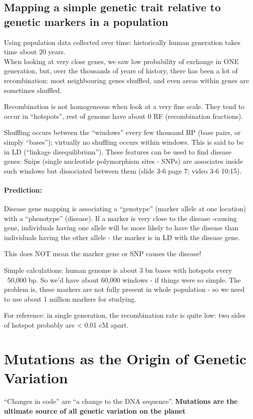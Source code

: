 \documentclass{scrartcl}
\begin{document}
\subsection{Mapping a simple genetic trait relative to genetic markers in a
  population}
\label{sec:3-6}
Using population data collected over time: historically human generation takes
time about 20 years. \\
When looking at very close genes, we saw low probability of exchange in ONE
generation, but, over the thousands of years of history, there has been a lot of
recombination: most neighbouring genes shuffled, and even areas within genes are
sometimes shuffled.

Recombination is not homogeneous when look at a very fine scale. They tend to
occur in ``hotspots'', rest of genome have about 0 RF (recombination fractions).

Shuffling occurs between the ``windows'' every few thousand BP (base pairs, or
simply ``bases''); virtually no shuffling occurs within windows. This is said to
be in LD (``linkage disequilibrium''). These features can be used to find
disease genes: Snips (single nucleotide polymorphism sites - SNPs) are
associates inside such windows but dissociated between them (slide 3-6 page 7;
video 3-6 10:15).

\paragraph{Prediction:}

Disease gene mapping is associating a ``genotype'' (marker allele at one
location) with a ``phenotype'' (disease). If a marker is very close to the
disease -causing gene, individuals having one allele will be more likely to have
the disease than individuals having the other allele - the marker is in LD with
the disease gene.

This does NOT mean the marker gene or SNP causes the disease!

Simple calculations: human genome is about 3 bn bases with hotspots every
~50,000 bp. So we'd have about 60,000 windows - if things were so simple. The
problem is, these markers are not fully present in whole population - so we need
to use about 1 million markers for studying.

For reference: in single generation, the recombination rate is quite low: two
sides of hotspot probably are < 0.01 cM apart.

\section{Mutations as the Origin of Genetic Variation}
\label{sec:04-1}
``Changes in code'' are  ``a change to the DNA sequence''.
{\bf Mutations are the ultimate source of all genetic variation on the planet}
\end{document}
